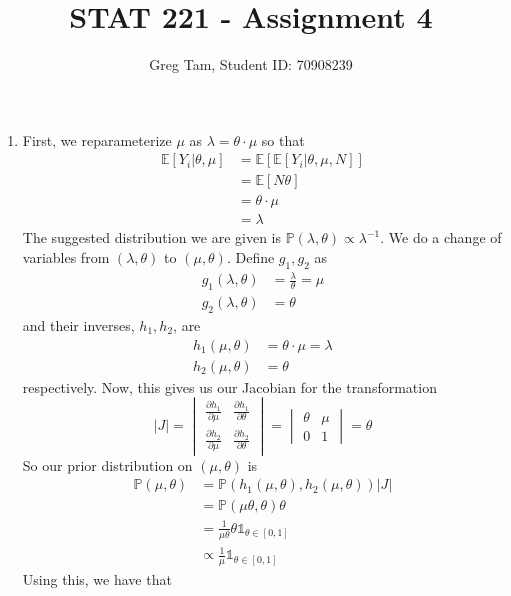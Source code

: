 \documentclass[letterpaper,10pt]{amsart}
\newcommand{\E}[1]{\mathbb{E}\!\left[#1\right]}
\newcommand{\p}[1]{\mathbb{P}\!\left(#1\right)}
\begin{document}
\title{STAT 221 - Assignment 4}
\author{Greg Tam, Student ID: 70908239}
\date{}
\maketitle


\begin{enumerate}[{1}.1]
\item First, we reparameterize $\mu$ as $\lambda = \theta \cdot \mu$ so that
\begin{align*}
\E{Y_i | \theta, \mu} &= \E{\E{Y_i | \theta, \mu, N}}\\
&= \E{N \theta}\\
&= \theta \cdot \mu\\
&= \lambda
\end{align*}
The suggested distribution we are given is $\p{\lambda, \theta} \propto \lambda^{-1}$. We do a change of variables from $(\lambda, \theta)$ to $(\mu, \theta)$. Define $g_1, g_2$ as
\begin{align*}
g_1(\lambda, \theta) &= \frac{\lambda}{\theta} = \mu\\
g_2(\lambda, \theta) &= \theta
\end{align*}
and their inverses, $h_1, h_2$, are
\begin{align*}
h_1(\mu, \theta) &= \theta \cdot \mu = \lambda\\
h_2(\mu, \theta) &= \theta
\end{align*}
respectively. Now, this gives us our Jacobian for the transformation
\[|J| = \begin{vmatrix}
\frac{\partial h_1}{\partial \mu} & \frac{\partial h_1}{\partial \theta}\\
\frac{\partial h_2}{\partial \mu} & \frac{\partial h_2}{\partial \theta}
\end{vmatrix} = \begin{vmatrix}
\theta & \mu\\
0 & 1
\end{vmatrix} = \theta \]
So our prior distribution on $(\mu, \theta)$ is
\begin{align*}
\p{\mu, \theta} &= \p{h_1(\mu, \theta), h_2(\mu, \theta)} |J|\\
&= \p{\mu \theta, \theta} \theta\\
&= \frac{1}{\mu \theta} \theta \mathds{1}_{\theta \in [0,1]} \\
&\propto \frac{1}{\mu} \mathds{1}_{\theta \in [0,1]}
\end{align*}
Using this, we have that
\begin{align*}

\end{align*}
\end{enumerate}
\end{document}
